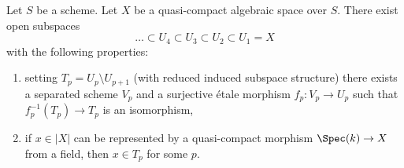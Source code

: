 \begin{lemma}
\label{lemma-filter-quasi-compact}
Let $S$ be a scheme. Let $X$ be a quasi-compact algebraic space
over $S$. There exist open subspaces
$$
\ldots \subset U_4 \subset U_3 \subset U_2 \subset U_1 = X
$$
with the following properties:
\begin{enumerate}
\item setting $T_p = U_p \setminus U_{p + 1}$ (with reduced induced subspace
structure) there exists a separated scheme $V_p$ and a surjective \'etale
morphism $f_p : V_p \to U_p$ such that $f_p^{-1}(T_p) \to T_p$ is an
isomorphism,
\item if $x \in |X|$ can be represented by a quasi-compact morphism
$\Spec(k) \to X$ from a field, then $x \in T_p$ for some $p$.
\end{enumerate}
\end{lemma}

